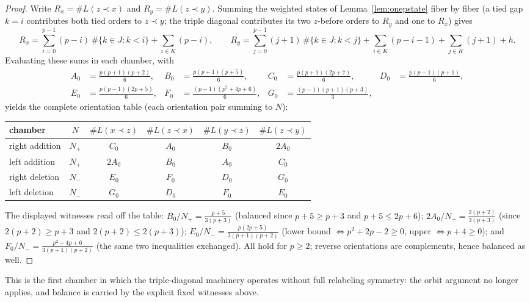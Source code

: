 \documentclass[11pt]{article}
\theoremstyle{definition}
\theoremstyle{remark}
\begin{document}
\begin{proof}
Write $R_x=\#L(z\prec x)$ and $R_y=\#L(z\prec y)$. Summing the weighted states of
Lemma~\ref{lem:onepstate} fiber by fiber (a tied gap $k=i$ contributes both tied orders
to $z\prec y$; the triple diagonal contributes its two $z$-before orders to $R_y$ and one
to $R_x$) gives
\[
R_x=\sum_{i=0}^{p-1}(p-i)\,\#\{k\in J:k<i\}+\sum_{i\in K}(p-i),\qquad
R_y=\sum_{j=0}^{p-1}(j+1)\,\#\{k\in J:k<j\}+\sum_{i\in K}(p-i-1)+\sum_{j\in K}(j+1)+h.
\]
Evaluating these sums in each chamber, with
\[
\begin{aligned}
A_0&=\tfrac{p(p+1)(p+2)}{6}, & B_0&=\tfrac{p(p+1)(p+5)}{6}, & C_0&=\tfrac{p(p+1)(2p+7)}{6},
& D_0&=\tfrac{p(p-1)(p+1)}{6},\\
E_0&=\tfrac{p(p-1)(2p+5)}{6}, & F_0&=\tfrac{(p-1)(p^2+4p+6)}{6}, & G_0&=\tfrac{(p-1)(p+1)(p+3)}{3},
\end{aligned}
\]
yields the complete orientation table (each orientation pair summing to $N$):
\begin{center}
\begin{tabular}{@{}lccccc@{}}\toprule
chamber & $N$ & $\#L(x\prec z)$ & $\#L(z\prec x)$ & $\#L(y\prec z)$ & $\#L(z\prec y)$\\ \midrule
right addition & $N_+$ & $C_0$ & $A_0$ & $B_0$ & $2A_0$\\
left addition & $N_+$ & $2A_0$ & $B_0$ & $A_0$ & $C_0$\\
right deletion & $N_-$ & $E_0$ & $F_0$ & $D_0$ & $G_0$\\
left deletion & $N_-$ & $G_0$ & $D_0$ & $F_0$ & $E_0$\\ \bottomrule
\end{tabular}
\end{center}
The displayed witnesses read off the table: $B_0/N_+=\frac{p+5}{3(p+3)}$ (balanced since
$p+5\ge p+3$ and $p+5\le 2p+6$); $2A_0/N_+=\frac{2(p+2)}{3(p+3)}$ (since
$2(p+2)\ge p+3$ and $2(p+2)\le2(p+3)$); $E_0/N_-=\frac{p(2p+5)}{3(p+1)(p+2)}$ (lower
bound $\iff p^2+2p-2\ge0$, upper $\iff p+4\ge0$); and
$F_0/N_-=\frac{p^2+4p+6}{3(p+1)(p+2)}$ (the same two inequalities exchanged). All hold
for $p\ge2$; reverse orientations are complements, hence balanced as well.
\end{proof}

This is the first chamber in which the triple-diagonal machinery operates without full
relabeling symmetry: the orbit argument no longer applies, and balance is carried by the
explicit fixed witnesses above.
\end{document}
